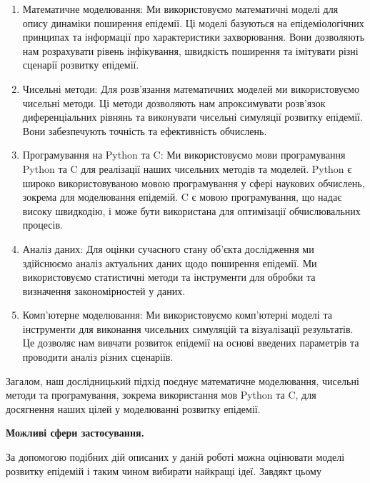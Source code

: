 \begin{enumerate}
    \item Математичне моделювання: Ми використовуємо математичні моделі для опису динаміки поширення епідемії. Ці моделі базуються на епідеміологічних принципах та інформації про характеристики захворювання. Вони дозволяють нам розрахувати рівень інфікування, швидкість поширення та імітувати різні сценарії розвитку епідемії.

    \item Чисельні методи: Для розв'язання математичних моделей ми використовуємо чисельні методи. Ці методи дозволяють нам апроксимувати розв'язок диференціальних рівнянь та виконувати чисельні симуляції розвитку епідемії. Вони забезпечують точність та ефективність обчислень.

    \item Програмування на Python та C: Ми використовуємо мови програмування Python та C для реалізації наших чисельних методів та моделей. Python є широко використовуваною мовою програмування у сфері наукових обчислень, зокрема для моделювання епідемій. C є мовою програмування, що надає високу швидкодію, і може бути використана для оптимізації обчислювальних процесів.

    \item Аналіз даних: Для оцінки сучасного стану об'єкта дослідження ми здійснюємо аналіз актуальних даних щодо поширення епідемії. Ми використовуємо статистичні методи та інструменти для обробки та визначення закономірностей у даних.

    \item Комп'ютерне моделювання: Ми використовуємо комп'ютерні моделі та інструменти для виконання чисельних симуляцій та візуалізації результатів. Це дозволяє нам вивчати розвиток епідемії на основі введених параметрів та проводити аналіз різних сценаріїв.

\end{enumerate}
Загалом, наш дослідницький підхід поєднує математичне моделювання, чисельні методи та програмування, зокрема використання мов Python та C, для досягнення наших цілей у моделюванні розвитку епідемії.

\textbf{Можливі сфери застосування.}

За допомогою подібних дій описаних у даній роботі можна оцінювати моделі 
розвитку епідемій і таким чином вибирати найкращі ідеї. Завдякт цьому 


